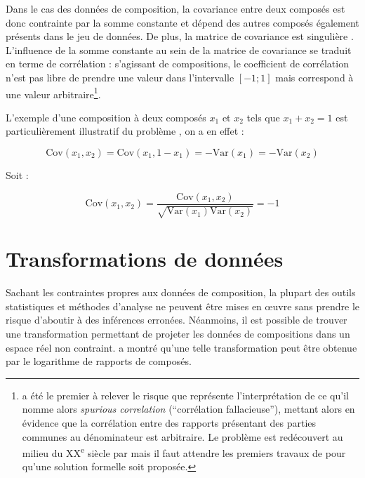 \documentclass[
  french,
]{scrbook}
\begin{document}
\begin{tcolorbox}[fonttitle=\sffamily\bfseries\large,title=Remarque,colframe=darkblue]
Dans le cas des données de composition, la covariance entre deux composés est donc contrainte par la somme constante et dépend des autres composés également présents dans le jeu de données. De plus, la matrice de covariance est singulière \autocite{vandenboogaart2013}. L'influence de la somme constante au sein de la matrice de covariance se traduit en terme de corrélation : s'agissant de compositions, le coefficient de corrélation n'est pas libre de prendre une valeur dans l'intervalle \([-1;1]\) mais correspond à une valeur arbitraire\footnote{\textcite{pearson1896} a été le premier à relever le risque que représente l'interprétation de ce qu'il nomme alors \emph{spurious correlation} (``corrélation fallacieuse''), mettant alors en évidence que la corrélation entre des rapports présentant des parties communes au dénominateur est arbitraire. Le problème est redécouvert au milieu du XX\textsuperscript{e} siècle par \textcite{chayes1960} mais il faut attendre les premiers travaux de \textcite{aitchison1982} pour qu'une solution formelle soit proposée.}.

L'exemple d'une composition à deux composés \(x_1\) et \(x_2\) tels que \(x_1 + x_2 = 1\) est particulièrement illustratif du problème \autocite[p.~54]{aitchison1986}, on a en effet :

\begin{equation*}
  \mathrm{Cov}(x_{1}, x_{2}) = \mathrm{Cov}(x_{1}, 1 - x_{1}) = - \mathrm{Var}(x_{1}) = - \mathrm{Var}(x_{2})
  \label{eq:negbias3}
\end{equation*}

Soit :

\begin{equation*}
  \mathrm{Cov}(x_{1}, x_{2}) = \frac{\mathrm{Cov}(x_{1}, x_{2})}{\sqrt{\mathrm{Var}(x_{1}) \mathrm{Var}(x_{2})}} = - 1
  \label{eq:negbias4}
\end{equation*}

\end{tcolorbox}

\hypertarget{coda-transformations}{%
\chapter{Transformations de données}\label{coda-transformations}}

Sachant les contraintes propres aux données de composition, la plupart des outils statistiques et méthodes d'analyse ne peuvent être mises en œuvre sans prendre le risque d'aboutir à des inférences erronées. Néanmoins, il est possible de trouver une transformation permettant de projeter les données de compositions dans un espace réel non contraint. \textcite{aitchison1986} a montré qu'une telle transformation peut être obtenue par le logarithme de rapports de composés.
\end{document}
